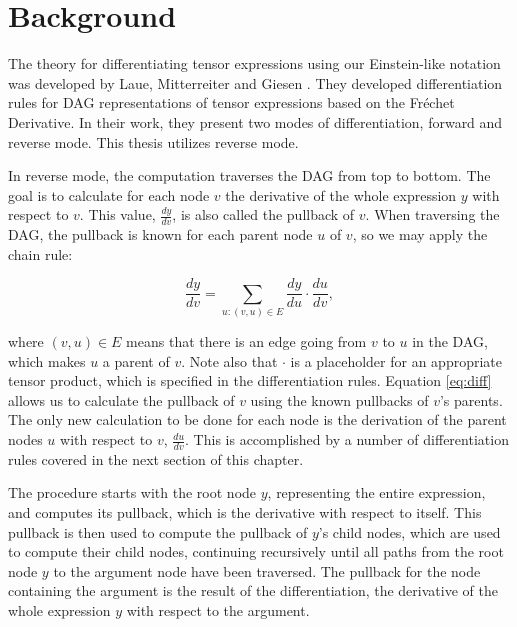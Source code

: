 \documentclass[12pt, a4paper]{report} %
\begin{document}
\section{Background}
The theory for differentiating tensor expressions using our Einstein-like notation was developed by Laue, Mitterreiter and Giesen \cite{tensorpaper}.
They developed differentiation rules for DAG representations of tensor expressions based on the Fr\'{e}chet Derivative.
In their work, they present two modes of differentiation, forward and reverse mode.
This thesis utilizes reverse mode.

In reverse mode, the computation traverses the DAG from top to bottom.
The goal is to calculate for each node $v$ the derivative of the whole expression $y$ with respect to $v$.
This value, $\frac{dy}{dv}$, is also called the pullback of $v$.
When traversing the DAG, the pullback is known for each parent node $u$ of $v$, so we may apply the chain rule:

\begin{equation}
    \frac{dy}{dv} = \sum_{u: (v,u) \in E} \frac{dy}{du} \cdot \frac{du}{dv},
    \label{eq:diff}
\end{equation}

where $(v,u) \in E$ means that there is an edge going from $v$ to $u$ in the DAG, which makes $u$ a parent of $v$. 
Note also that $\cdot$ is a placeholder for an appropriate tensor product, which is specified in the differentiation rules. 
Equation \ref{eq:diff} allows us to calculate the pullback of $v$ using the known pullbacks of $v$'s parents.
The only new calculation to be done for each node is the derivation of the parent nodes $u$ with respect to $v$, $\frac{du}{dv}$.
This is accomplished by a number of differentiation rules covered in the next section of this chapter.

The procedure starts with the root node $y$, representing the entire expression, and computes its pullback, which is the derivative with respect to itself.
This pullback is then used to compute the pullback of $y$'s child nodes, which are used to compute their child nodes, continuing recursively until all paths from the root node $y$ to the argument node have been traversed.
The pullback for the node containing the argument is the result of the differentiation, the derivative of the whole expression $y$ with respect to the argument.
\end{document}
